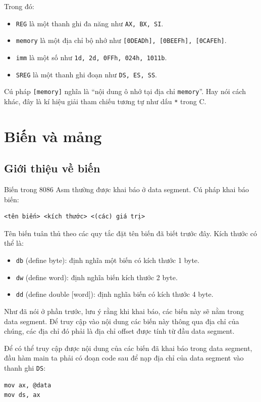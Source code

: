\documentclass[12pt]{report}
\newcommand{\code}[1]{\texttt{#1}}
\begin{document}
Trong đó:
\begin{itemize}
    \item \code{REG} là một thanh ghi đa năng như \code{AX, BX, SI}.
    \item \code{memory} là một địa chỉ bộ nhớ như \code{[0DEADh], [0BEEFh], [0CAFEh]}.
    \item \code{imm} là một số như \code{1d, 2d, 0FFh, 024h, 1011b}.
    \item \code{SREG} là một thanh ghi đoạn như \code{DS, ES, SS}.
\end{itemize}

Cú pháp \code{[memory]} nghĩa là ``nội dung ô nhớ tại địa chỉ \code{memory}''. Hay nói cách khác, đây là kí hiệu giải tham chiếu tương tự như dấu \code{*} trong C.

\section{Biến và mảng}
\subsection{Giới thiệu về biến}
Biến trong 8086 Asm thường được khai báo ở data segment.
Cú pháp khai báo biến:
\begin{verbatim}
<tên biến> <kích thước> <(các) giá trị>
\end{verbatim}

Tên biến tuân thủ theo các quy tắc đặt tên biến đã biết trước đây.
Kích thước có thể là:
\begin{itemize}
    \item \code{db} (define byte): định nghĩa một biến có kích thước 1 byte.
    \item \code{dw} (define word): định nghĩa biến kích thước 2 byte.
    \item \code{dd} (define double [word]): định nghĩa biến có kích thước 4 byte.
\end{itemize}

Như đã nói ở phần trước, lưu ý rằng khi khai báo, các biến này sẽ nằm trong data segment. Để truy cập vào nội dung các biến này thông qua địa chỉ của chúng, các địa chỉ đó phải là địa chỉ offset được tính từ đầu data segment.

Để có thể truy cập được nội dung của các biến đã khai báo trong data segment, đầu hàm main ta phải có đoạn code sau để nạp địa chỉ của data segment vào thanh ghi \code{DS}:
\begin{verbatim}
mov ax, @data 
mov ds, ax
\end{verbatim}
\end{document}
